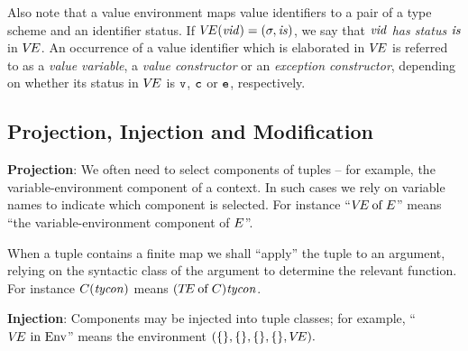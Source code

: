 Also note that a value environment maps value identifiers to a pair of
a type scheme and an identifier status. If $\mbox{$V\!E$}({\it vid})=(\sigma,{\it is})$,
we say that ${\it vid}$ {\sl has status} ${\it is}$ in $\mbox{$V\!E$}$.  An occurrence of a
value identifier which is elaborated in $\mbox{$V\!E$}$ is referred to as a
{\sl value variable}, a {\sl value constructor} or an {\sl exception constructor},
depending on whether its status in $\mbox{$V\!E$}$ is ${{\tt v}}$, ${{\tt c}}$ or ${{\tt e}}$, respectively.
\subsection{Projection, Injection and Modification}
\label{stat-proj}
{\bf Projection}: We often need to select components of tuples -- for example,
the variable-environment component of a context. In such cases we
rely on  variable names to indicate which component
is selected. For instance ``$\mbox{$V\!E$} \mathbin{\rm of} E$'' means ``the variable-environment
component
of $E$''.

When a tuple contains a finite map we shall ``apply'' the
tuple to an argument, relying on the syntactic class of the argument to
determine the relevant function. For instance $C({\it tycon})$ means
$(\mbox{$T\!E$} \mathbin{\rm of} C){\it tycon}$.



{\bf Injection}: Components may be injected into tuple classes; for example,\linebreak
``$\VE\ \In\ \Env$'' means the environment
$(\{\},\{\},\{\},\{\}, \mbox{$V\!E$}).$ %



